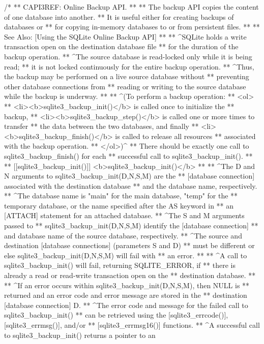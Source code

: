 \begin{Codex}[label=sqlite3.h,numbers=left]
{/*
** CAPI3REF: Online Backup API.
**
** The backup API copies the content of one database into another.
** It is useful either for creating backups of databases or
** for copying in-memory databases to or from persistent files. 
**
** See Also: [Using the SQLite Online Backup API]
**
** ^SQLite holds a write transaction open on the destination database file
** for the duration of the backup operation.
** ^The source database is read-locked only while it is being read;
** it is not locked continuously for the entire backup operation.
** ^Thus, the backup may be performed on a live source database without
** preventing other database connections from
** reading or writing to the source database while the backup is underway.
** 
** ^(To perform a backup operation: 
**   <ol>
**     <li><b>sqlite3_backup_init()</b> is called once to initialize the
**         backup, 
**     <li><b>sqlite3_backup_step()</b> is called one or more times to transfer 
**         the data between the two databases, and finally
**     <li><b>sqlite3_backup_finish()</b> is called to release all resources 
**         associated with the backup operation. 
**   </ol>)^
** There should be exactly one call to sqlite3_backup_finish() for each
** successful call to sqlite3_backup_init().
**
** [[sqlite3_backup_init()]] <b>sqlite3_backup_init()</b>
**
** ^The D and N arguments to sqlite3_backup_init(D,N,S,M) are the 
** [database connection] associated with the destination database 
** and the database name, respectively.
** ^The database name is "main" for the main database, "temp" for the
** temporary database, or the name specified after the AS keyword in
** an [ATTACH] statement for an attached database.
** ^The S and M arguments passed to 
** sqlite3_backup_init(D,N,S,M) identify the [database connection]
** and database name of the source database, respectively.
** ^The source and destination [database connections] (parameters S and D)
** must be different or else sqlite3_backup_init(D,N,S,M) will fail with
** an error.
**
** ^A call to sqlite3_backup_init() will fail, returning SQLITE_ERROR, if 
** there is already a read or read-write transaction open on the 
** destination database.
**
** ^If an error occurs within sqlite3_backup_init(D,N,S,M), then NULL is
** returned and an error code and error message are stored in the
** destination [database connection] D.
** ^The error code and message for the failed call to sqlite3_backup_init()
** can be retrieved using the [sqlite3_errcode()], [sqlite3_errmsg()], and/or
** [sqlite3_errmsg16()] functions.
** ^A successful call to sqlite3_backup_init() returns a pointer to an
}
\end{Codex}
